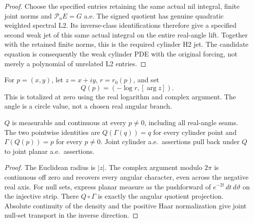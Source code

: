 \begin{proof}
\leanok
Choose the specified entries retaining the same actual nil integral, finite
joint norms and $\mathcal P_aE=G$ a.e.
The signed quotient has genuine quadratic weighted spectral L2.
Its inverse-class identifications therefore give a specified second weak jet
of this same actual integral on the entire real-angle lift.
Together with the retained finite norms, this is the required cylinder H2 jet.
The candidate equation is consequently the weak cylinder PDE with the original
forcing, not merely a polynomial of unrelated L2 entries.
\end{proof}

\begin{definition}
\label{def:log-cylinder-inverse-coordinates}
\leanok
For $p=(x,y)$, let $z=x+iy$, $r=r_0(p)$, and set
\[
 Q(p)=(-\log r,[\arg z]).
\]
This is totalized at zero using the real logarithm and complex argument.
The angle is a circle value, not a chosen real angular branch.
\end{definition}

\begin{lemma}
\label{lem:log-cylinder-inverse-coordinates}
\leanok
$Q$ is measurable and continuous at every $p\ne0$, including all real-angle seams.
The two pointwise identities are
$Q(\Gamma(q))=q$ for every cylinder point and $\Gamma(Q(p))=p$ for every $p\ne0$.
Joint cylinder a.e.\ assertions pull back under $Q$ to joint planar a.e.\ assertions.
\end{lemma}

\begin{proof}
\leanok
The Euclidean radius is $|z|$. The complex argument modulo $2\pi$ is continuous
off zero and recovers every angular character, even across the negative real axis.
For null sets, express planar measure as the pushforward of
$e^{-2t}\,dt\,d\vartheta$ on the injective strip.
There $Q\circ\Gamma$ is exactly the angular quotient projection.
Absolute continuity of the density and the positive Haar normalization give
joint null-set transport in the inverse direction.
\end{proof}

